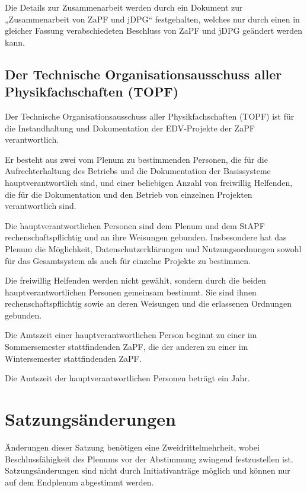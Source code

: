 \documentclass[
  a4paper,
  oneside]{scrartcl}
\begin{document}
Die Details zur Zusammenarbeit werden durch ein Dokument zur
„Zusammenarbeit von ZaPF und jDPG`` festgehalten, welches nur durch
einen in gleicher Fassung verabschiedeten Beschluss von ZaPF und jDPG
geändert werden kann.

\hypertarget{der-technische-organisationsausschuss-aller-physikfachschaften-topf}{%
\subsection{Der Technische Organisationsausschuss aller
Physikfachschaften
(TOPF)}\label{der-technische-organisationsausschuss-aller-physikfachschaften-topf}}

Der Technische Organisationsausschuss aller Physikfachschaften (TOPF)
ist für die Instandhaltung und Dokumentation der EDV-Projekte der ZaPF
verantwortlich.

Er besteht aus zwei vom Plenum zu bestimmenden Personen, die für die
Aufrechterhaltung des Betriebs und die Dokumentation der Basissysteme
hauptverantwortlich sind, und einer beliebigen Anzahl von freiwillig
Helfenden, die für die Dokumentation und den Betrieb von einzelnen
Projekten verantwortlich sind.

Die hauptverantwortlichen Personen sind dem Plenum und dem StAPF
rechenschaftspflichtig und an ihre Weisungen gebunden. Insbesondere hat
das Plenum die Möglichkeit, Datenschutzerklärungen und Nutzungsordnungen
sowohl für das Gesamtsystem als auch für einzelne Projekte zu bestimmen.

Die freiwillig Helfenden werden nicht gewählt, sondern durch die beiden
hauptverantwortlichen Personen gemeinsam bestimmt. Sie sind ihnen
rechenschaftspflichtig sowie an deren Weisungen und die erlassenen
Ordnungen gebunden.

Die Amtszeit einer hauptverantwortlichen Person beginnt zu einer im
Sommersemester stattfindenden ZaPF, die der anderen zu einer im
Wintersemester stattfindenden ZaPF.

Die Amtszeit der hauptverantwortlichen Personen beträgt ein Jahr.

\hypertarget{satzungsuxe4nderungen}{%
\section{Satzungsänderungen}\label{satzungsuxe4nderungen}}

Änderungen dieser Satzung benötigen eine Zweidrittelmehrheit, wobei
Beschlussfähigkeit des Plenums vor der Abstimmung zwingend festzustellen
ist. Satzungsänderungen sind nicht durch Initiativanträge möglich und
können nur auf dem Endplenum abgestimmt werden.
\end{document}
